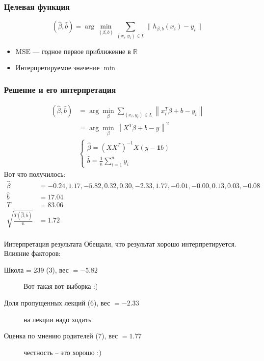 \documentclass[14pt, fleqn, xcolor={dvipsnames, table}, hyperref={unicode}, babel={english,russian}, inputenc=utf8x]{beamer}
\begin{document}
\begin{frame}[t]\frametitle{Целевая функция}
    $$
      (\hat{\beta},\hat{b}) = \arg\min_{(\beta,b)} \sum_{(x_i,y_i) \in L} \| h_{\beta,b}(x_i) - y_i \|
    $$
\begin{itemize}
  \item MSE --- годное первое приближение в $\mathbb{R}$
  \item Интерпретируемое значение $\min$
\end{itemize}
\end{frame}

\begin{frame}[t]\frametitle{Решение и его интерпретация}
    $$
      \begin{array}{ll}
      (\hat{\beta}, \hat{b}) &= \arg\min_\beta \sum_{(x_i,y_i) \in L} \left\| x_i^T\beta + b - y_i \right\| \\
       &= \arg\min_\beta \left\|X^T\beta + b - y\right\|^2 \\
       &\left\{\begin{array}{l}
        \hat{\beta} = \left(XX^T\right)^{-1}X(y - \mathbf{1}b) \\
        \hat{b} = \frac{1}{n} \sum_{i=1}^n y_i
       \end{array}\right.
      \end{array}
    $$
    Вот что получилось:
    {\scriptsize
    $$\begin{array}{ll}
      \hat{\beta} &= -0.24, 1.17, -5.82, 0.32, 0.30, -2.33, 1.77, -0.01, -0.00, 0.13, 0.03, -0.08\\
      \hat{b} &= 17.04 \\
      T&= 83.06 \\
      \sqrt{\frac{T(\hat{\beta}, \hat{b})}{n}} &= 1.72\\
    \end{array}
    $$}
\end{frame}

\begin{frame}{Интерпретация результата}
Обещали, что результат хорошо интерпретируется. Влияние факторов:
\footnotesize
\begin{description}
\item[Школа = 239 (3), вес $=-5.82$] Вот такая вот выборка :)
\item[Доля пропущенных лекций (6), вес $=-2.33$] на лекции надо ходить
\item[Оценка по мнению родителей (7), вес $=1.77$] честность -- это хорошо :)
\end{description}
\end{frame}
\end{document}
